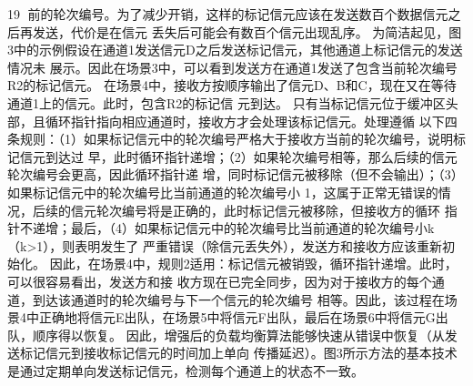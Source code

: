                                                 19
前的轮次编号。为了减少开销，这样的标记信元应该在发送数百个数据信元之后再发送，代价是在信元
丢失后可能会有数百个信元出现乱序。
为简洁起见，图3中的示例假设在通道1发送信元D之后发送标记信元，其他通道上标记信元的发送情况未
展示。因此在场景3中，可以看到发送方在通道1发送了包含当前轮次编号R2的标记信元。
在场景4中，接收方按顺序输出了信元D、B和C，现在又在等待通道1上的信元。此时，包含R2的标记信
元到达。
只有当标记信元位于缓冲区头部，且循环指针指向相应通道时，接收方才会处理该标记信元。处理遵循
以下四条规则：（1）如果标记信元中的轮次编号严格大于接收方当前的轮次编号，说明标记信元到达过
早，此时循环指针递增；（2）如果轮次编号相等，那么后续的信元轮次编号会更高，因此循环指针递
增，同时标记信元被移除（但不会输出）；（3）如果标记信元中的轮次编号比当前通道的轮次编号小
1，这属于正常无错误的情况，后续的信元轮次编号将是正确的，此时标记信元被移除，但接收方的循环
指针不递增；最后，（4）如果标记信元中的轮次编号比当前通道的轮次编号小k（k>1），则表明发生了
严重错误（除信元丢失外），发送方和接收方应该重新初始化。
因此，在场景4中，规则2适用：标记信元被销毁，循环指针递增。此时，可以很容易看出，发送方和接
收方现在已完全同步，因为对于接收方的每个通道，到达该通道时的轮次编号与下一个信元的轮次编号
相等。因此，该过程在场景4中正确地将信元E出队，在场景5中将信元F出队，最后在场景6中将信元G出
队，顺序得以恢复。
因此，增强后的负载均衡算法能够快速从错误中恢复（从发送标记信元到接收标记信元的时间加上单向
传播延迟）。图3所示方法的基本技术是通过定期单向发送标记信元，检测每个通道上的状态不一致。

